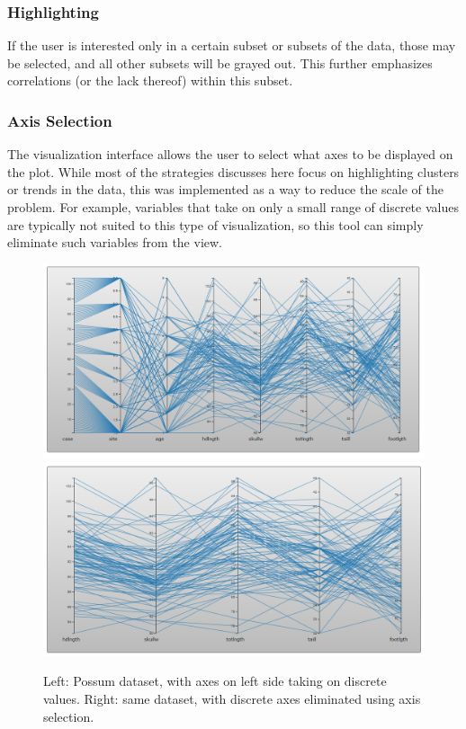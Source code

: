 \documentclass[]{article}
\begin{document}
		\subsubsection{Highlighting}
			If the user is interested only in a certain subset or subsets of the data, those may be selected, and all other subsets will be grayed out. This further emphasizes correlations (or the lack thereof) within this subset.
		\subsubsection{Axis Selection}
			The visualization interface allows the user to select what axes to be displayed on the plot. While most of the strategies discusses here focus on highlighting clusters or trends in the data, this was implemented as a way to reduce the scale of the problem. For example, variables that take on only a small range of discrete values are typically not suited to this type of visualization\cite{kosara}, so this tool can simply eliminate such variables from the view.
			\begin{figure}[h]
				\includegraphics[width=\linewidth/2]{possum_bad.png}
				\includegraphics[width=\linewidth/2]{possum_good.png}
				\caption{Left: Possum dataset\cite{datasets}, with axes on left side taking on discrete values. Right: same dataset, with discrete axes eliminated using axis selection.}
				\label{fig:Result}
			\end{figure}
\end{document}
